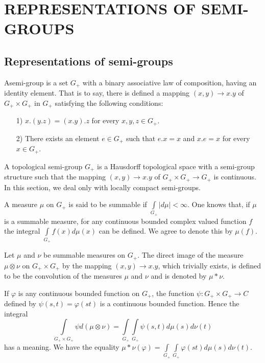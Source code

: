 \part{REPRESENTATIONS OF SEMI-GROUPS}

\chapter{Representations of semi-groups}\label{chap17}

\setcounter{section}{17}
\setcounter{definition}{0}
\begin{definition}\label{chap17:def17.1}
A\pageoriginale semi-group is a set $G_+$ with a binary associative
law of composition, having an identity element. That is to say, there
is defined a mapping $(x, y) \to x.y$ of $G_+ \times G_+$ in $G_+$
satisfying the following conditions: 
\begin{itemize}
\item [1)] $x.(y.z) = (x.y).z$ for every $x, y, z \in G_+$.
\item [2)] There exists an element $e \in G_+$ such that $e.x = x$ and
  $x.e=x$ for every $x \in G_+$. 
\end{itemize}
\end{definition}

\begin{definition}\label{chap17:def17.2}
A topological semi-group $G_+$ is a Hausdorff topological space with a
semi-group structure such that the mapping $(x, y) \to x.y$ of $G_+
\times G_+\to G_+$ is continuous. In this section, we deal only with locally
compact semi-groups. 
\end{definition}

\begin{definition}\label{chap17:def17.3}
A measure $\mu$ on $G_+$ is said to be summable if
$\int\limits_{G_+}|d\mu| < \infty$. One knows that, if $\mu$ is a
summable measure, for any continuous bounded complex valued function
$f$ the integral $\int\limits_{G_+} f(x) d \mu(x)$ can be defined. We
agree to denote this by $\mu (f)$.
\end{definition}

\begin{definition}\label{chap17:def17.4}
Let $\mu$ and $\nu$ be summable measures on $G_+$. The direct image of
the measure $\mu \otimes \nu$ on $G_+ \times G_+$ by the mapping $(x,
y) \to x.y$, which trivially exists, is defined to be the convolution
of the measures $\mu$ and $\nu$ and is denoted by $\mu * \nu$. 

If $\varphi$ is any continuous bounded function on $G_+$, the function
$\psi : G_+ \times G_+ \to C$ defined by $\psi (s, t) = \varphi(st)$
is a continuous bounded function. Hence the integral
$$
\int\limits_{G_+\times G_+}\psi d(\mu \otimes \nu)=
\int\limits_{G_+}\int\limits_{G_+} \psi(s, t) d \mu (s) d \nu (t)
$$\pageoriginale
has a meaning. We have the equality $\mu * \nu (\varphi)=
\int\limits_{G_+} \int\limits_{G_+} \varphi(st)d \mu(s)d \nu (t)$.
\end{definition}


